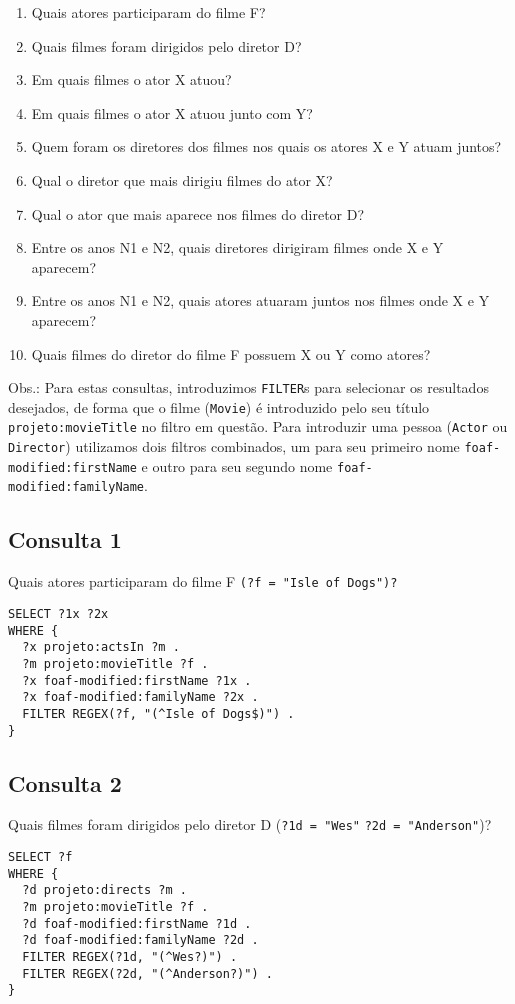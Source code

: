 \documentclass{article}
\newcommand{\code}[1]{\lstinline[mathescape=true]{#1}}
\begin{document}
\begin{enumerate}
  \item Quais atores participaram do filme F\@?
  \item Quais filmes foram dirigidos pelo diretor D\@?
  \item Em quais filmes o ator X atuou?
  \item Em quais filmes o ator X atuou junto com Y\@?
  \item Quem foram os diretores dos filmes nos quais os atores X e Y atuam juntos?
  \item Qual o diretor que mais dirigiu filmes do ator X\@?
  \item Qual o ator que mais aparece nos filmes do diretor D\@?
  \item Entre os anos N1 e N2, quais diretores dirigiram filmes onde X e Y aparecem?
  \item Entre os anos N1 e N2, quais atores atuaram juntos nos filmes onde X e Y aparecem?
  \item Quais filmes do diretor do filme F possuem X ou Y como atores?
\end{enumerate}

Obs.: Para estas consultas, introduzimos \code{FILTER}s para selecionar os resultados desejados, de
forma que o filme (\code{Movie}) é introduzido pelo seu título \code{projeto:movieTitle} no filtro
em questão. Para introduzir uma pessoa (\code{Actor} ou \code{Director}) utilizamos dois filtros
combinados, um para seu primeiro nome \code{foaf-modified:firstName} e outro para seu segundo nome
\code{foaf-modified:familyName}.

\subsection{Consulta 1}

Quais atores participaram do filme F \code{(?f = "Isle of Dogs")?}

\begin{lstlisting}[basicstyle=\ttfamily,frame=single]
SELECT ?1x ?2x
WHERE {
  ?x projeto:actsIn ?m .
  ?m projeto:movieTitle ?f .
  ?x foaf-modified:firstName ?1x .
  ?x foaf-modified:familyName ?2x .
  FILTER REGEX(?f, "(^Isle of Dogs$)") .
}
\end{lstlisting}
\subsection{Consulta 2}
Quais filmes foram dirigidos pelo diretor D (\code{?1d = "Wes"} \code{?2d = "Anderson"})?
\begin{lstlisting}[basicstyle=\ttfamily,frame=single]
SELECT ?f
WHERE {
  ?d projeto:directs ?m .
  ?m projeto:movieTitle ?f .
  ?d foaf-modified:firstName ?1d .
  ?d foaf-modified:familyName ?2d .
  FILTER REGEX(?1d, "(^Wes?)") .
  FILTER REGEX(?2d, "(^Anderson?)") .
}
\end{lstlisting}
\end{document}
